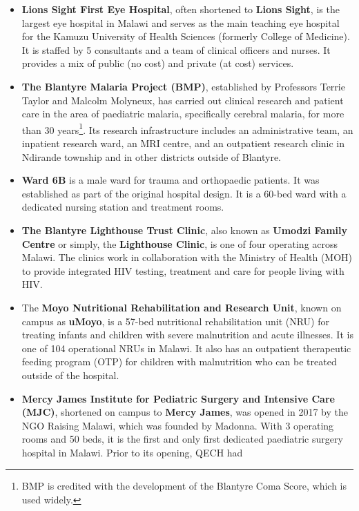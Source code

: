 \documentclass[
  authoryear,
  review,
  3p]{elsarticle}
\begin{document}
\begin{itemize}
\item
  \textbf{Lions Sight First Eye Hospital}, often shortened to
  \textbf{Lions Sight}, is the largest eye hospital in Malawi and serves
  as the main teaching eye hospital for the Kamuzu University of Health
  Sciences (formerly College of Medicine). It is staffed by 5
  consultants and a team of clinical officers and nurses. It provides a
  mix of public (no cost) and private (at cost) services.
\item
  \textbf{The Blantyre Malaria Project (BMP)}, established by Professors
  Terrie Taylor and Malcolm Molyneux, has carried out clinical research
  and patient care in the area of paediatric malaria, specifically
  cerebral malaria, for more than 30 years\footnote{BMP is credited with
    the development of the Blantyre Coma Score, which is used widely.}.
  Its research infrastructure includes an administrative team, an
  inpatient research ward, an MRI centre, and an outpatient research
  clinic in Ndirande township and in other districts outside of
  Blantyre.
\item
  \textbf{Ward 6B} is a male ward for trauma and orthopaedic patients.
  It was established as part of the original hospital design. It is a
  60-bed ward with a dedicated nursing station and treatment rooms.
\item
  \textbf{The Blantyre Lighthouse Trust Clinic}, also known as
  \textbf{Umodzi Family Centre} or simply, the \textbf{Lighthouse
  Clinic}, is one of four operating across Malawi. The clinics work in
  collaboration with the Ministry of Health (MOH) to provide integrated
  HIV testing, treatment and care for people living with HIV.
\item
  The \textbf{Moyo Nutritional Rehabilitation and Research Unit}, known
  on campus as \textbf{uMoyo}, is a 57-bed nutritional rehabilitation
  unit (NRU) for treating infants and children with severe malnutrition
  and acute illnesses. It is one of 104 operational NRUs in Malawi. It
  also has an outpatient therapeutic feeding program (OTP) for children
  with malnutrition who can be treated outside of the hospital.
\item
  \textbf{Mercy James Institute for Pediatric Surgery and Intensive Care
  (MJC)}, shortened on campus to \textbf{Mercy James}, was opened in
  2017 by the NGO Raising Malawi, which was founded by Madonna. With 3
  operating rooms and 50 beds, it is the first and only first dedicated
  paediatric surgery hospital in Malawi. Prior to its opening, QECH had

\end{itemize}
\end{document}

